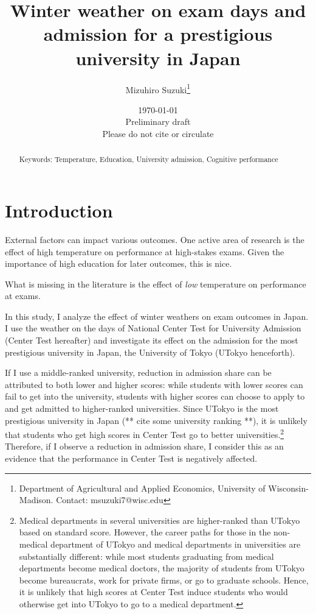 \documentclass[12pt,letterpaper]{article}
\title{Winter weather on exam days and admission for a prestigious university in Japan}%
\author{Mizuhiro Suzuki\thanks{Department of Agricultural and Applied Economics, University of Wisconsin-Madison. Contact: msuzuki7@wisc.edu}}
\date{\today \\ \vspace{1cm} Preliminary draft \\ Please do not cite or circulate}
\begin{document}
  
\maketitle
\begin{abstract}
  \singlespacing
     \noindent 
  
  \medskip
  \vspace{1cm}
 \noindent Keywords: Temperature, Education, University admission, Cognitive performance
\end{abstract}

\newpage

\section{Introduction}

External factors can impact various outcomes.
One active area of research is the effect of high temperature on performance at high-stakes exams.
Given the importance of high education for later outcomes, this is nice.

What is missing in the literature is the effect of \textit{low} temperature on performance at exams.

In this study, I analyze the effect of winter weathers on exam outcomes in Japan.
I use the weather on the days of National Center Test for University Admission (Center Test hereafter) and investigate its effect on the admission for the most prestigious university in Japan, the University of Tokyo (UTokyo henceforth).

If I use a middle-ranked university, reduction in admission share can be attributed to both lower and higher scores:
while students with lower scores can fail to get into the university, students with higher scores can choose to apply to and get admitted to higher-ranked universities.
Since UTokyo is the most prestigious university in Japan (** cite some university ranking **), it is unlikely that students who get high scores in Center Test go to better universities.\footnote{
  Medical departments in several universities are higher-ranked than UTokyo based on standard score.
  However, the career paths for those in the non-medical department of UTokyo and medical departments in universities are substantially different:
  while most students graduating from medical departments become medical doctors, the majority of students from UTokyo become bureaucrats, work for private firms, or go to graduate schools.
  Hence, it is unlikely that high scores at Center Test induce students who would otherwise get into UTokyo to go to a medical department.
}
Therefore, if I observe a reduction in admission share, I consider this as an evidence that the performance in Center Test is negatively affected. 
\end{document}
